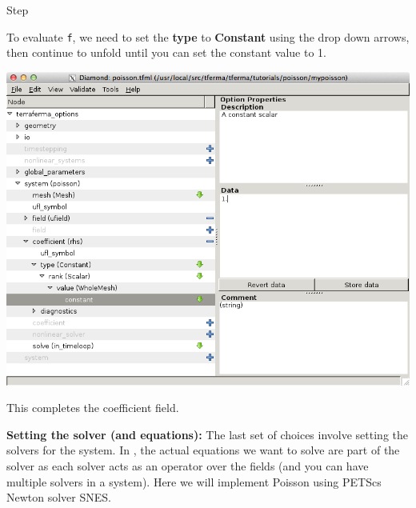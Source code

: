 \begin{steps}{Step}
\begin{center}
\end{center}
 To evaluate \texttt{f}, we need to set the \textbf{type} to
\textbf{Constant} using the drop down arrows, then continue to unfold
until you can set the constant value to 1.
\begin{center}
    \includegraphics[width=\diamondwidth]{figures/screendumps/diamond_poisson_10c.png}
\end{center}
This completes the coefficient field.
\item \textbf{Setting the solver (and equations):}  The last set of
  choices involve setting the solvers for the system.  In \TF{}, the
  actual equations we want to solve are part of the solver as each
  solver acts as an operator over the fields (and you can have
  multiple solvers in a system).  Here we will implement Poisson using
  PETScs Newton solver SNES.  


\end{steps}
